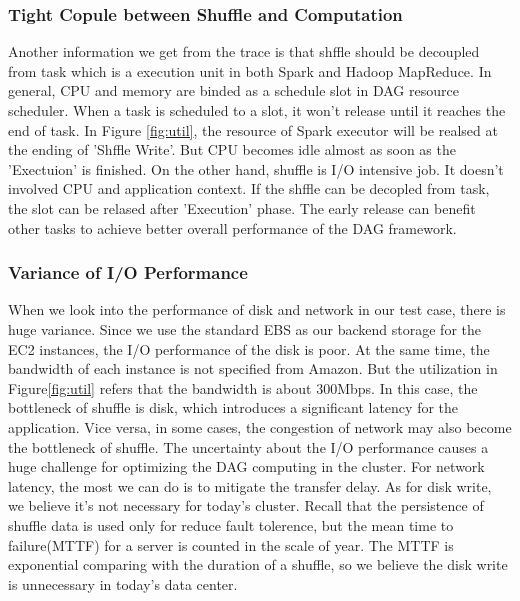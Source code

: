\subsubsection{Tight Copule between Shuffle and Computation}
Another information we get from the trace is that shffle should be decoupled from task which is a execution unit in both Spark and Hadoop MapReduce. In general, CPU and memory are binded as a schedule slot in DAG resource scheduler. When a task is scheduled to a slot, it won't release until it reaches the end of task. In Figure \ref{fig:util}, the resource of Spark executor will be realsed at the ending of 'Shffle Write'.
But CPU becomes idle almost as soon as the 'Exectuion' is finished. On the other hand, shuffle is I/O intensive job. It doesn't involved CPU and application context. If the shffle can be decopled from task, the slot can be relased after 'Execution' phase. The early release can benefit other tasks to achieve better overall performance of the DAG framework.

\subsubsection{Variance of I/O Performance}
When we look into the performance of disk and network in our test case, there is huge variance. Since we use the standard EBS as our backend storage for the EC2 instances, the I/O performance of the disk is poor. 
At the same time, the bandwidth of each instance is not specified from Amazon. But the utilization in Figure\ref{fig:util} refers that the bandwidth is about 300Mbps. In this case, the bottleneck of shuffle is disk, which introduces a significant latency for the application. Vice versa, in some cases, the congestion of network may also become the bottleneck of shuffle\cite{varys}. The uncertainty about the I/O performance causes a huge challenge for optimizing the DAG computing in the cluster. For network latency, the most we can do is to mitigate the transfer delay. As for disk write, we believe it's not necessary for today's cluster. Recall that the persistence of shuffle data is used only for reduce fault tolerence, but the mean time to failure(MTTF) for a server is counted in the scale of year\cite{tachyon}. The MTTF is exponential comparing with the duration of a shuffle, so we believe the disk write is unnecessary in today's data center. 

